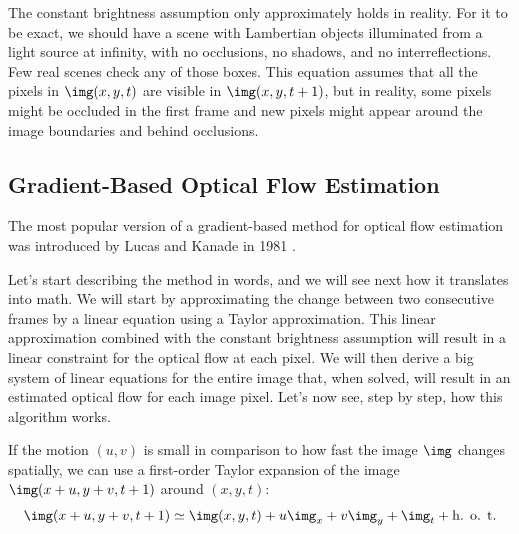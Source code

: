 
The constant brightness assumption only approximately holds in reality. For it to be exact, we should have a scene with Lambertian objects illuminated from a light source at infinity, with no occlusions, no shadows, and no interreflections. Few real scenes check any of those boxes. This equation assumes that all the pixels in $\img(x, y, t)$ are visible in $\img(x, y, t+1)$, but in reality, some pixels might be occluded in the first frame and new pixels might appear around the image boundaries and behind occlusions.




\subsection{Gradient-Based Optical Flow Estimation}


The most popular version of a gradient-based method for optical flow estimation was introduced by Lucas and Kanade in 1981 \cite{Lucas1981}.

Let's start describing the method in words, and we will see next how it translates into math. We will start by approximating the change between two consecutive frames by a linear equation using a Taylor approximation. This linear approximation combined with the constant brightness assumption will result in a linear constraint for the optical flow at each pixel. We will then derive a big system of linear equations for the entire image that, when solved, will result in an estimated optical flow for each image pixel. Let's now see, step by step, how this algorithm works.



If the motion $(u,v)$ is small in comparison to how fast the image $\img$ changes spatially, we can use a first-order Taylor expansion of the image $\img (x +u, y+v, t + 1)$ around $(x,y,t)$:
\begin{equation}
    \img (x +u, y+v, t + 1)  \simeq \img (x,y,t) + u \img_x  + v \img_y + \img_t + \mbox{h. o. t.}
    \label{eq:motion_taylor}
\end{equation}

